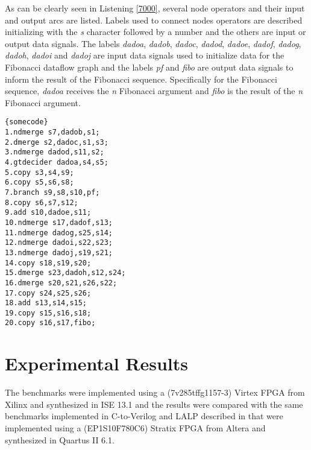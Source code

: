 \documentclass[preprint,12pt]{elsarticle}
\begin{document}
As can be clearly seen in Listening \ref{7000}, several node operators and their input and output arcs are listed. Labels used to connect nodes operators are described initializing with the {\it s} character followed by a number and the others are input or output data signals. The labels
{\it dadoa}, {\it dadob}, {\it dadoc}, {\it dadod}, {\it dadoe}, {\it dadof}, {\it dadog}, {\it dadoh}, {\it dadoi} and {\it dadoj} are input data signals used to initialize data for the Fibonacci dataflow graph and the labels {\it pf} and {\it fibo} are output data signals to inform the result of the Fibonacci sequence. Specifically for the Fibonacci sequence, {\it dadoa} receives the {\it n} Fibonacci argument and {\it fibo} is the result of the {\it n} Fibonacci argument.


{\tiny
\lstset{language=VHDL}
\lstset{commentstyle=\textit}
\lstset{backgroundcolor=,rulecolor=}
\begin{lstlisting}[frame=tb,caption= {\it The Assembler Language for Fibonacci Dataflow Graph},label=7000]{somecode}
1.ndmerge s7,dadob,s1;
2.dmerge s2,dadoc,s1,s3;
3.ndmerge dadod,s11,s2;
4.gtdecider dadoa,s4,s5;
5.copy s3,s4,s9;
6.copy s5,s6,s8;
7.branch s9,s8,s10,pf;
8.copy s6,s7,s12;
9.add s10,dadoe,s11;
10.ndmerge s17,dadof,s13;
11.ndmerge dadog,s25,s14;
12.ndmerge dadoi,s22,s23;
13.ndmerge dadoj,s19,s21;
14.copy s18,s19,s20;
15.dmerge s23,dadoh,s12,s24;
16.dmerge s20,s21,s26,s22;
17.copy s24,s25,s26;
18.add s13,s14,s15;
19.copy s15,s16,s18;
20.copy s16,s17,fibo;
\end{lstlisting}
}






\section{Experimental Results}\label{l4}

The benchmarks were implemented using a (7v285tffg1157-3) Virtex FPGA from Xilinx and synthesized in ISE 13.1 and the results were compared with the same benchmarks implemented in C-to-Verilog and LALP described in \cite{r83} that were implemented using a (EP1S10F780C6) Stratix FPGA from Altera and synthesized in Quartus II 6.1.
\end{document}
